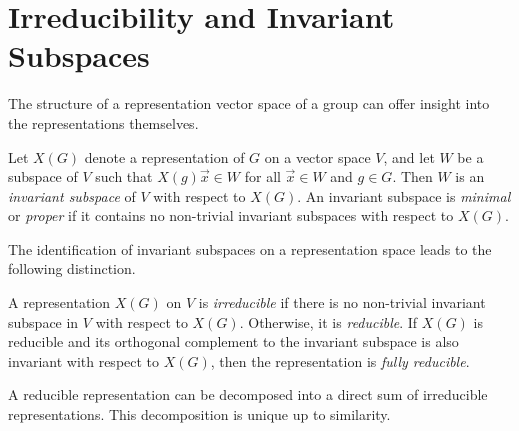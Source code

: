 \section{Irreducibility and Invariant Subspaces}

The structure of a representation vector space of a group can offer insight into the representations themselves.
\begin{definition}
    Let $X(G)$ denote a representation of $G$ on a vector space $V$, and let $W$ be a subspace of $V$ such that $X(g)\vec{x}\in W$ for all $\vec{x}\in W$ and $g\in G$. Then $W$ is an \textit{invariant subspace} of $V$ with respect to $X(G)$. An invariant subspace is \textit{minimal} or \textit{proper} if it contains no non-trivial invariant subspaces with respect to $X(G)$.
\end{definition}

The identification of invariant subspaces on a representation space leads to the following distinction.
\begin{definition}
    A representation $X(G)$ on $V$ is \textit{irreducible} if there is no non-trivial invariant subspace in $V$ with respect to $X(G)$. Otherwise, it is \textit{reducible}. If $X(G)$ is reducible and its orthogonal complement to the invariant subspace is also invariant with respect to $X(G)$, then the representation is \textit{fully reducible}.
\end{definition}

A reducible representation can be decomposed into a direct sum of irreducible representations. This decomposition is unique up to similarity.

